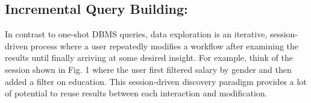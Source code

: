 \documentclass[12pt,letterpaper, onecolumn]{exam}
\begin{document}
    \subsection{Incremental Query Building:}
     In contrast to one-shot DBMS queries, data exploration is an iterative, session-driven process where a user repeatedly modifies a workflow after examining the results until finally arriving at some desired insight. For example, think of the session shown in Fig. 1 where the user first filtered salary by gender and then added a filter on education. This session-driven discovery paradigm provides a lot of potential to reuse results between each interaction and modification.
     
\end{document}
